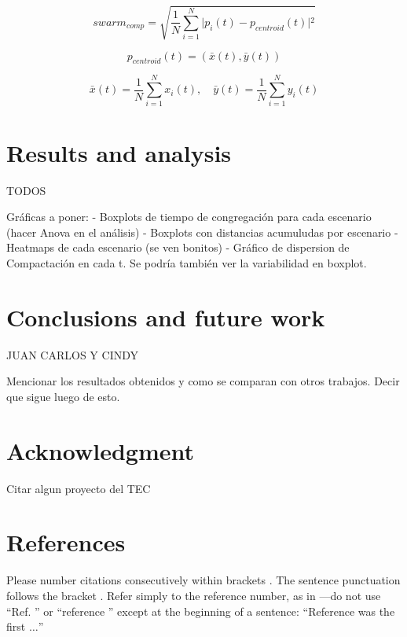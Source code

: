 \documentclass[conference]{IEEEtran}
\begin{document}
\begin{equation}
    swarm_{comp} = \sqrt{\frac{1}{N} \sum_{i=1}^N \vert{} p_i(t) - p_{centroid}(t) \vert{}^2}
    \label{eq:compaction}
\end{equation}

\begin{equation}
    p_{centroid}(t)= (\bar{x}(t), \bar{y}(t))
    \label{eq:centroid}
\end{equation}

\begin{equation}
    \bar{x}(t) = \frac{1}{N}\sum_{i=1}^N x_i(t), \quad \bar{y}(t) = \frac{1}{N}\sum_{i=1}^N y_i(t)
    \label{eq:avg_xy}
\end{equation}


\section{Results and analysis}
TODOS

Gráficas a poner:
 - Boxplots de tiempo de congregación para cada escenario (hacer Anova en el análisis)
 - Boxplots con distancias acumuludas por escenario
 - Heatmaps de cada escenario (se ven bonitos)
 - Gráfico de dispersion de Compactación en cada t. Se podría también ver la variabilidad en boxplot.

\section{Conclusions and future work}
JUAN CARLOS Y CINDY

Mencionar los resultados obtenidos y como se comparan con otros trabajos.
Decir que sigue luego de esto.

\section*{Acknowledgment}

Citar algun proyecto del TEC

\section*{References}

Please number citations consecutively within brackets \cite{b1}. The
sentence punctuation follows the bracket \cite{b2}. Refer simply to the reference
number, as in \cite{b3}---do not use ``Ref. \cite{b3}'' or ``reference \cite{b3}'' except at
the beginning of a sentence: ``Reference \cite{b3} was the first $\ldots$''
\end{document}
